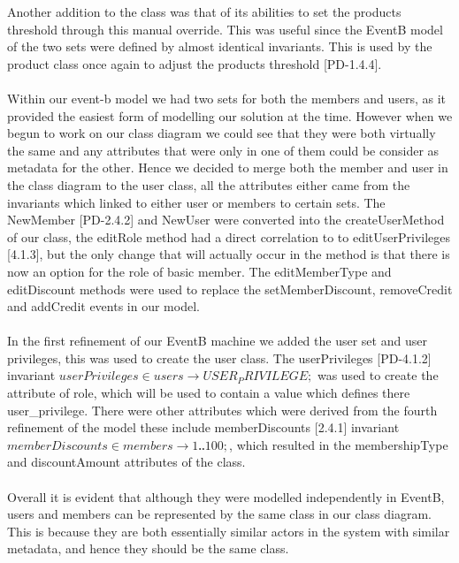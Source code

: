 \documentclass[a4paper]{article}
\begin{document}
Another addition to the class was that of its abilities to set the products threshold through this manual override. This was useful since the EventB model of the two sets were defined by almost identical invariants. This is used by the product class once again to adjust the products threshold [PD-1.4.4].
\\\\
Within our event-b model we had two sets for both the members and users, as it provided the easiest form of modelling our solution at the time. However when we begun to work on our class diagram we could see that they were both virtually the same and any attributes that were only in one of them could be consider as metadata for the other. Hence we decided to merge both the member and user in the class diagram to the user class, all the attributes either came from the invariants which linked to either user or members to certain sets. The NewMember [PD-2.4.2] and NewUser were converted into the createUserMethod of our class, the editRole method had a direct correlation to to editUserPrivileges [4.1.3], but the only change that will actually occur in the method is that there is now an option for the role of basic member. The editMemberType and editDiscount methods were used to replace the setMemberDiscount, removeCredit and addCredit events in our model.
\\\\
In the first refinement of our EventB machine we added the user set and user privileges, this was used to create the user class. The userPrivileges [PD-4.1.2] invariant \(userPrivileges ∈ users → USER_PRIVILEGE; \) was used to create the attribute of role, which will be used to contain a value which defines there user\_privilege. There were other attributes which were derived from the fourth refinement of the model these include memberDiscounts [2.4.1] invariant \(memberDiscounts ∈ members → 1‥100; \), which resulted in the membershipType and discountAmount attributes of the class.
\\\\
Overall it is evident that although they were modelled independently in EventB, users and members can be represented by the same class in our class diagram. This is because they are both essentially similar actors in the system with similar metadata, and hence they should be the same class.
\\\\
\end{document}
